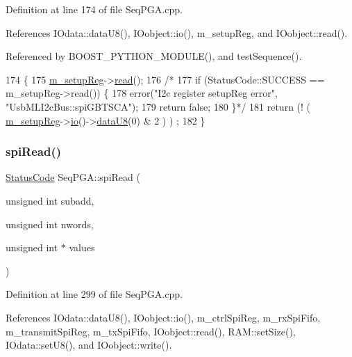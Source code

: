 Definition at line 174 of file Seq\+P\+G\+A.\+cpp.



References I\+Odata\+::data\+U8(), I\+Oobject\+::io(), m\+\_\+setup\+Reg, and I\+Oobject\+::read().



Referenced by B\+O\+O\+S\+T\+\_\+\+P\+Y\+T\+H\+O\+N\+\_\+\+M\+O\+D\+U\+L\+E(), and test\+Sequence().


\begin{DoxyCode}
174                        \{
175   \hyperlink{classSeqPGA_a03269241e7fc26493cd0595beda334c2}{m\_setupReg}->\hyperlink{classIOobject_aa07610c11963b1db6710e3c76ceea456}{read}();
176   \textcolor{comment}{/*}
177 \textcolor{comment}{    if (StatusCode::SUCCESS == m\_setupReg->read()) \{}
178 \textcolor{comment}{    error("I2c register setupReg error", "UsbMLI2cBus::spiGBTSCA");}
179 \textcolor{comment}{    return false;}
180 \textcolor{comment}{    \}*/}
181   \textcolor{keywordflow}{return} (! ( \hyperlink{classSeqPGA_a03269241e7fc26493cd0595beda334c2}{m\_setupReg}->\hyperlink{classIOobject_af04fb94137c3d86849f478ac5afab5d1}{io}()->\hyperlink{classIOdata_a75e9c318dbac3a39402179070943d4bc}{dataU8}(0) & 2 ) ) ;
182 \}
\end{DoxyCode}
\mbox{\label{classSeqPGA_ab3d0e5e5d4014bc7a92588a76b8713d4}} 
\subsubsection{\texorpdfstring{spi\+Read()}{spiRead()}\hspace{0.1cm}{\footnotesize\ttfamily [1/3]}}
{\footnotesize\ttfamily \hyperlink{classStatusCode}{Status\+Code} Seq\+P\+G\+A\+::spi\+Read (\begin{DoxyParamCaption}\item[{unsigned int}]{subadd,  }\item[{unsigned int}]{nwords,  }\item[{unsigned int $\ast$}]{values }\end{DoxyParamCaption})}



Definition at line 299 of file Seq\+P\+G\+A.\+cpp.



References I\+Odata\+::data\+U8(), I\+Oobject\+::io(), m\+\_\+ctrl\+Spi\+Reg, m\+\_\+rx\+Spi\+Fifo, m\+\_\+transmit\+Spi\+Reg, m\+\_\+tx\+Spi\+Fifo, I\+Oobject\+::read(), R\+A\+M\+::set\+Size(), I\+Odata\+::set\+U8(), and I\+Oobject\+::write().



